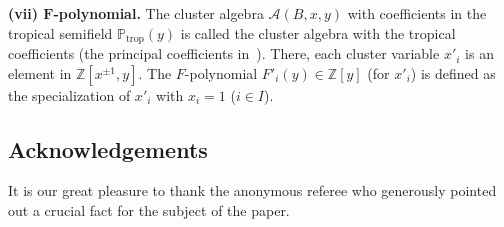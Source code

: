 \documentclass[pdftex]{sigma}
\numberwithin{equation}{section}
\theoremstyle{definition}
\begin{document}
{\bf (vii) $\boldsymbol{F}$-polynomial.}
The cluster algebra $\mathcal{A}(B,x,y)$ with coef\/f\/icients in
the tropical semi\-f\/ield $\mathbb{P}_{\mathrm{trop}}(y)$ is called the
cluster algebra with the tropical coef\/f\/icients
(the principal coef\/f\/icients in~\cite{Fomin07}).
There, each cluster variable $x'_i$ is an element
in $\mathbb{Z}[x^{\pm 1},y]$.
The $F$-polynomial $F'_i(y)\in \mathbb{Z}[y]$ (for $x'_i$)
is def\/ined as the specialization of $x'_i$ with $x_i=1$ ($i\in I$).

\subsection*{Acknowledgements} It is our great pleasure to thank
the anonymous
referee who generously pointed out a crucial fact for the subject
of the paper.
\end{document}
